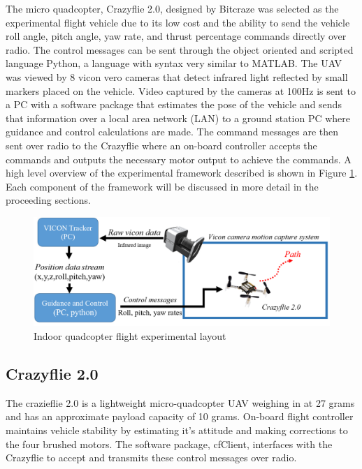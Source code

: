 \documentclass[numbered,pdftex]{ohio-etd}
\begin{document}
The micro quadcopter, Crazyflie 2.0, designed by Bitcraze was selected as the experimental flight vehicle due to its low cost and the ability to send the vehicle roll angle, pitch angle, yaw rate, and thrust percentage commands directly over radio. The control messages can be sent through the object oriented and scripted language Python, a language with syntax very similar to MATLAB. The UAV was viewed by 8 vicon vero cameras that detect infrared light reflected by small markers placed on the vehicle. Video captured by the cameras at 100Hz is sent to a PC with a software package that estimates the pose of the vehicle and sends that information over a local area network (LAN) to a ground station PC where guidance and control calculations are made. The command messages are then sent over radio to the Crazyflie where an on-board controller accepts the commands and outputs the necessary motor output to achieve the commands. A high level overview of the experimental framework described is shown in Figure \ref{fig:experimentalFramework}. Each component of the framework will be discussed in more detail in the proceeding sections. 

\begin{figure}
	\centering
	\includegraphics[trim=0 0 0 0,clip,width=15cm]{PaperFigures/Methods/experimentalSetup}
	\caption{Indoor quadcopter flight experimental layout}
	\label{fig:experimentalFramework}
\end{figure}

\subsection{Crazyflie 2.0}
The crazieflie 2.0 is a lightweight micro-quadcopter UAV weighing in at 27 grams and has an approximate payload capacity of 10 grams. On-board flight controller maintains vehicle stability by estimating it's attitude and making corrections to the four brushed motors. The software package, cfClient, interfaces with the Crazyflie to accept and transmits these control messages over radio. 
\end{document}
